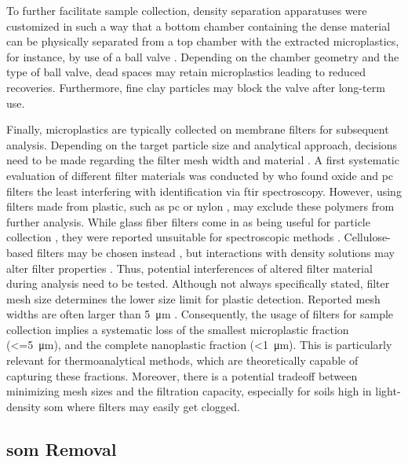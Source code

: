 To further facilitate sample collection, density separation apparatuses were customized in such a way that a bottom chamber containing the dense material can be physically separated from a top chamber with the extracted microplastics, for instance, by use of a ball valve \citep{ImhofNovel2012,ZobkovEvaluation2017,CoppockSmallscale2017,MahatSeparation2017}.
Depending on the chamber geometry and the type of ball valve, dead spaces may retain microplastics leading to reduced recoveries. Furthermore, fine clay particles may block the valve after long-term use.

Finally, microplastics are typically collected on membrane filters for subsequent analysis. Depending on the target particle size and analytical approach, decisions need to be made regarding the filter mesh width and material \citep{MintenigIdentification2017,LoderFocal2015}. A first systematic evaluation of different filter materials was conducted by \citet{LoderFocal2015} who found  oxide and \ac{pc} filters the least interfering with identification via \ac{ftir} spectroscopy. However, using filters made from plastic, such as
\ac{pc} \citep{LoderFocal2015} or nylon \citep{LiuMicroplastic2018}, may exclude these polymers from further analysis. While glass fiber filters come in as being useful for particle collection \citep{HuangAgricultural2020,ChenMixing2020}, they were reported unsuitable for spectroscopic methods \citep{LoderFocal2015}. Cellulose-based filters may be chosen instead \citep{ZhouMicroplastics2020,CorradiniEvidence2019,vandenBergSewage2020}, but interactions with density solutions may alter filter properties \citep{QuinnValidation2017}. Thus, potential interferences of altered filter material during analysis need to be tested. Although not always specifically stated, filter mesh size determines the lower size limit for plastic detection. Reported mesh widths are often larger than \SI{5}{\micro\meter} \citep{HuangAgricultural2020,ZhouMicroplastics2020}. Consequently, the usage of filters for sample collection implies a systematic loss of the smallest microplastic fraction (\SI{<=5}{\micro\meter}), and the complete nanoplastic fraction (\SI{<1}{\micro\meter}). This is particularly relevant for thermoanalytical methods, which are theoretically capable of capturing these fractions. Moreover, there is a potential tradeoff between minimizing mesh sizes and the filtration capacity, especially for soils high in light-density \ac{som} where filters may easily get clogged.

\subsection{\Acs{som} Removal}
\label{sec:analytical-techniques:som-removal}

